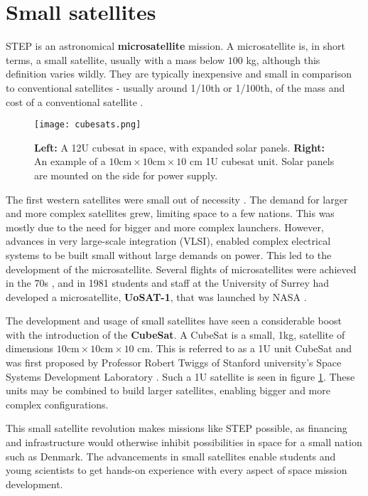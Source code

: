 \documentclass[../main.tex]{subfiles}
\begin{document}
	\section{Small satellites}
	STEP is an astronomical \textbf{microsatellite} mission. A microsatellite is, in short terms, a small satellite, usually with a mass below $100$ kg\cite{SSE}, although this definition varies wildly. They are typically inexpensive and small in comparison to conventional satellites - usually around 1/10th or 1/100th, of the mass and cost of a conventional satellite \cite{SSE}. 
	\begin{figure}[H]
		\centering			
		\texttt{[image: cubesats.png]}
		\caption{\textbf{Left:} A 12U cubesat in space, with expanded solar panels\cite{cubesatimage}. \textbf{Right:} An example of a $10\text{cm} \times 10\text{cm} \times 10$ cm 1U cubesat unit. Solar panels are mounted on the side for power supply. }
		\label{fig:cubesatex}
	\end{figure}
	
	The first western satellites were small out of necessity \cite{SSE}. The demand for larger and more complex satellites grew, limiting space to a few nations. This was mostly due to the need for bigger and more complex launchers. However, advances in very large-scale integration (VLSI), enabled complex electrical systems to be built small without large demands on power. This led to the development of the microsatellite. Several flights of microsatellites were achieved in the 70s \cite{SSE}, and in 1981 students and staff at the University of Surrey had developed a microsatellite, \textbf{UoSAT-1}, that was launched by NASA \cite{uosat}. 
	
	The development and usage of small satellites have seen a considerable boost with the introduction of the \textbf{CubeSat}. A CubeSat is a small, 1kg, satellite of dimensions $10\text{cm} \times 10\text{cm} \times 10$ cm. This is referred to as a 1U unit CubeSat and was first proposed by Professor Robert Twiggs of Stanford university's Space Systems Development Laboratory \cite{SSE, cubesatref}. Such a 1U satellite is seen in figure \ref{fig:cubesatex}. These units may be combined to build larger satellites, enabling bigger and more complex configurations.  
	
	This small satellite revolution makes missions like STEP possible, as financing and infrastructure would otherwise inhibit possibilities in space for a small nation such as Denmark. The advancements in small satellites enable students and young scientists to get hands-on experience with every aspect of space mission development.
	
\end{document}
